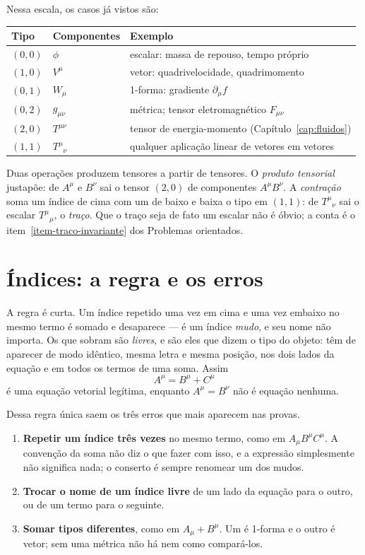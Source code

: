 \documentclass[12pt,a4paper,oneside]{book}
\theoremstyle{rgplain}
\theoremstyle{rgremark}
\begin{document}
Nessa escala, os casos já vistos são:
\begin{center}
\small
\begin{tabular}{llp{6.6cm}}
\toprule
Tipo & Componentes & Exemplo \\
\midrule
$(0,0)$ & $\phi$ & escalar: massa de repouso, tempo próprio \\
$(1,0)$ & $V^\mu$ & vetor: quadrivelocidade, quadrimomento \\
$(0,1)$ & $W_\mu$ & 1-forma: gradiente $\partial_\mu f$ \\
$(0,2)$ & $g_{\mu\nu}$ & métrica; tensor eletromagnético $F_{\mu\nu}$ \\
$(2,0)$ & $T^{\mu\nu}$ & tensor de energia-momento (Capítulo~\ref{cap:fluidos}) \\
$(1,1)$ & $T^\mu{}_\nu$ & qualquer aplicação linear de vetores em vetores \\
\bottomrule
\end{tabular}
\end{center}

Duas operações produzem tensores a partir de tensores. O \emph{produto
tensorial} justapõe: de $A^\mu$ e $B^\nu$ sai o tensor $(2,0)$ de componentes
$A^\mu B^\nu$. A \emph{contração} soma um índice de cima com um de baixo e
baixa o tipo em $(1,1)$: de $T^{\mu}{}_{\nu}$ sai o escalar $T^\mu{}_\mu$, o
\emph{traço}. Que o traço seja de fato um escalar não é óbvio; a conta é o item~\ref{item-traco-invariante} dos Problemas orientados.

\section{Índices: a regra e os erros}
\label{sec:regra-indices}

A regra é curta. Um índice repetido uma vez em cima e uma vez embaixo no mesmo
termo é somado e desaparece --- é um índice \emph{mudo}, e seu nome não
importa. Os que sobram são \emph{livres}, e são eles que dizem o tipo do
objeto: têm de aparecer de modo idêntico, mesma letra e mesma posição, nos dois
lados da equação e em todos os termos de uma soma. Assim
\[
  A^\mu=B^\mu+C^\mu
\]
é uma equação vetorial legítima, enquanto $A^\mu=B^\nu$ não é equação nenhuma.

Dessa regra única saem os três erros que mais aparecem nas provas.

\begin{enumerate}
  \item \textbf{Repetir um índice três vezes} no mesmo termo, como em
  $A_\mu B^\mu C^\mu$. A convenção da soma não diz o que fazer com isso, e a
  expressão simplesmente não significa nada; o conserto é sempre renomear um
  dos mudos.
  \item \textbf{Trocar o nome de um índice livre} de um lado da equação para o
  outro, ou de um termo para o seguinte.
  \item \textbf{Somar tipos diferentes}, como em $A_\mu+B^\mu$. Um é 1-forma e
  o outro é vetor; sem uma métrica não há nem como compará-los.
\end{enumerate}
\end{document}
